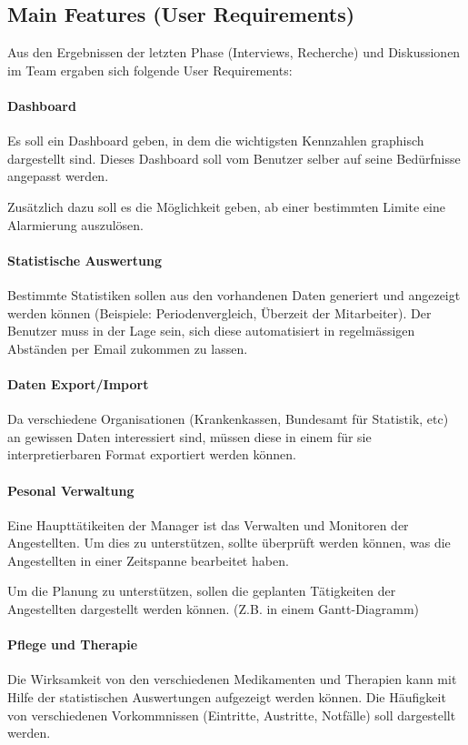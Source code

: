 \documentclass[a4paper]{scrreprt}
\begin{document}
\subsection{Main Features (User Requirements)}
Aus den Ergebnissen der letzten Phase (Interviews, Recherche) und Diskussionen im Team ergaben sich folgende User Requirements:

\paragraph{Dashboard}
Es soll ein Dashboard geben, in dem die wichtigsten Kennzahlen graphisch dargestellt sind. Dieses Dashboard soll vom Benutzer selber auf seine Bedürfnisse angepasst werden. 

Zusätzlich dazu soll es die Möglichkeit geben, ab einer bestimmten Limite eine Alarmierung auszulösen. 

\paragraph{Statistische Auswertung}
Bestimmte Statistiken sollen aus den vorhandenen Daten generiert und angezeigt werden können (Beispiele: Periodenvergleich, Überzeit der Mitarbeiter). Der Benutzer muss in der Lage sein, sich diese automatisiert in regelmässigen Abständen per Email zukommen zu lassen.

\paragraph{Daten Export/Import}
Da verschiedene Organisationen (Krankenkassen, Bundesamt für Statistik, etc) an gewissen Daten interessiert sind, müssen diese in einem für sie interpretierbaren Format exportiert werden können. 

\paragraph{Pesonal Verwaltung}
Eine Haupttätikeiten der Manager ist das Verwalten und Monitoren der Angestellten. Um dies zu unterstützen, sollte überprüft werden können, was die Angestellten in einer Zeitspanne bearbeitet haben. 

Um die Planung zu unterstützen, sollen die geplanten Tätigkeiten der Angestellten dargestellt werden können. (Z.B. in einem Gantt-Diagramm)

\paragraph{Pflege und Therapie}
Die Wirksamkeit von den verschiedenen Medikamenten und Therapien kann mit Hilfe der statistischen Auswertungen aufgezeigt werden können. Die Häufigkeit von verschiedenen Vorkommnissen (Eintritte, Austritte, Notfälle) soll dargestellt werden. 
\end{document}
